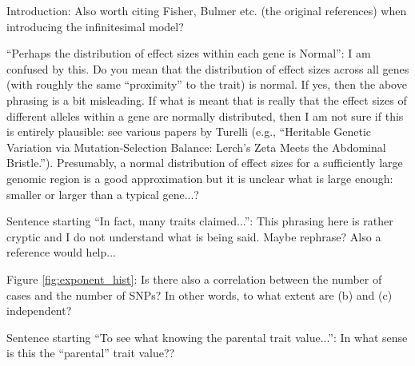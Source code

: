 \begin{point}{}
    Introduction: Also worth citing Fisher, Bulmer etc. (the original references) when introducing the infinitesimal model?
\end{point}

\reply{
}

\begin{point}{\revref}
    ``Perhaps the distribution of effect sizes within each gene is Normal'': I am confused by this. Do you mean that the distribution of effect sizes across all genes (with roughly the same ``proximity'' to the trait) is normal. If yes, then the above phrasing is a bit misleading. If what is meant that is really that the effect sizes of different alleles within a gene are normally distributed, then I am not sure if this is entirely plausible: see various papers by Turelli (e.g., ``Heritable Genetic Variation via Mutation-Selection Balance: Lerch's Zeta Meets the Abdominal Bristle.''). Presumably, a normal distribution of effect sizes for a sufficiently large genomic region is a good approximation but it is unclear what is large enough: smaller or larger than a typical gene...?
\end{point}


\begin{point}{\revref}
    Sentence starting ``In fact, many traits claimed...'': This phrasing here is rather cryptic and I do not understand what is being said. Maybe rephrase? Also a reference would help...
\end{point}

\reply{
}

\begin{point}{}
    Figure \ref{fig:exponent_hist}: Is there also a correlation between the number of cases and the number of SNPs? In other words, to what extent are (b) and (c) independent?
\end{point}


\begin{point}{\revref}
    Sentence starting ``To see what knowing the parental trait value...'': In what sense is this the ``parental'' trait value??
\end{point}


